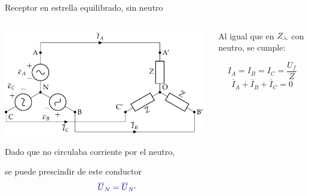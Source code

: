 \documentclass[aspectratio=169, usenames,svgnames,dvipsnames]{beamer}
\newcommand\wye{\scalerel*{\stackengine{-1pt}{%
  \rotatebox[origin=c]{30}{\rule{10pt}{.9pt}}\kern-1pt%
  \rotatebox[origin=c]{-30}{\rule{10pt}{1.3pt}}}{%
  \rule{.9pt}{10pt}}{O}{c}{F}{F}{S}}{\Delta}} %
\begin{document}
\begin{frame}{Receptor en estrella equilibrado, \hspace{3mm}sin neutro}
    \begin{columns}
    \begin{column}{0.79\columnwidth}
        \vspace{-21mm}

        \hspace*{0mm}
        \includegraphics[width=1.21\linewidth]{../figs/EstrellaEquilibrado_SinNeutro.pdf}
    
        \vspace{-58mm}
        
        \hspace*{32mm}
        \small{Dado que no circulaba corriente por el neutro,}

        \vspace{-3mm}
        \hspace*{38mm}
        \small{se puede \alert{prescindir} de este conductor}
        \LARGE{
        \[
            \qquad\quad  {\color{blue!50!black} \overline{U}_N = \overline{U}_{N'} }
        \]
        }
    \end{column}
    \begin{column}{0.21\columnwidth}
        \vspace*{-45mm}
        \footnotesize{
        \begin{center}
            Al igual que en $Z_{\wye}$ con neutro, se cumple:
        \end{center}    
        \[
          I_A = I_B = I_C = \frac{U_f}{Z}
        \]
        \[
          \overline{I}_A  + \overline{I}_B + \overline{I}_C = 0
        \]
        }
    \end{column}
    \end{columns}
\end{frame}
\end{document}
